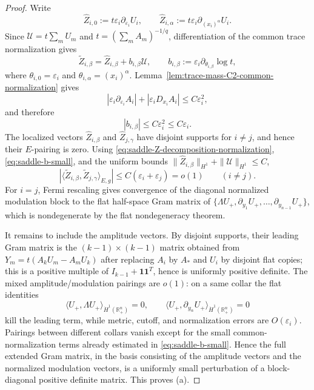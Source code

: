 \documentclass[11pt,reqno,a4paper]{amsart}
\numberwithin{equation}{section}
\theoremstyle{plain}
\theoremstyle{remark}
\theoremstyle{plain}
\begin{document}
\begin{proof}
Write
\[
\widehat Z_{i,0}:=t\varepsilon_i\partial_{\varepsilon_i}U_i,
\qquad
\widehat Z_{i,\alpha}:=t\varepsilon_i\partial_{(x_i)^\alpha}U_i.
\]
Since $\mathcal U=t\sum_mU_m$ and $t=(\sum_mA_m)^{-1/q}$, differentiation of the common trace
normalization gives
\begin{equation}\label{eq:saddle-Z-decomposition-normalization}
\widetilde Z_{i,\beta}
=\widehat Z_{i,\beta}+b_{i,\beta}\mathcal U,
\qquad
b_{i,\beta}:=\varepsilon_i\partial_{\theta_{i,\beta}}\log t,
\end{equation}
where $\theta_{i,0}=\varepsilon_i$ and $\theta_{i,\alpha}=(x_i)^\alpha$.
Lemma~\ref{lem:trace-mass-C2-common-normalization} gives
\[
|\varepsilon_i\partial_{\varepsilon_i}A_i|+|\varepsilon_iD_{x_i}A_i|
\le C\varepsilon_i^2,
\]
and therefore
\begin{equation}\label{eq:saddle-b-small}
|b_{i,\beta}|\le C\varepsilon_i^2\le C\varepsilon_i.
\end{equation}
The localized vectors $\widehat Z_{i,\beta}$ and $\widehat Z_{j,\gamma}$ have disjoint supports for
$i\ne j$, and hence their $E$-pairing is zero.  Using \eqref{eq:saddle-Z-decomposition-normalization},
\eqref{eq:saddle-b-small}, and the uniform bounds
$\|\widehat Z_{i,\beta}\|_{H^1}+\|\mathcal U\|_{H^1}\le C$,
\begin{equation}\label{eq:saddle-modulation-cross}
|\langle \widetilde Z_{i,\beta},\widetilde Z_{j,\gamma}\rangle_{E,g}|
\le C(\varepsilon_i+\varepsilon_j)
=o(1)
\qquad(i\ne j).
\end{equation}
For $i=j$, Fermi rescaling gives convergence of the diagonal normalized modulation block to the flat
half-space Gram matrix of
$\{\Lambda U_+,\partial_{y_1}U_+,\dots,\partial_{y_{n-1}}U_+\}$, which is nondegenerate by the
flat nondegeneracy theorem.

It remains to include the amplitude vectors.  By disjoint supports, their leading Gram matrix is the
$(k-1)\times(k-1)$ matrix obtained from
$Y_m=t(A_kU_m-A_mU_k)$ after replacing $A_i$ by $A_\ast$ and $U_i$ by disjoint flat copies; this is a
positive multiple of $I_{k-1}+\mathbf 1\mathbf 1^T$, hence is uniformly positive definite.  The mixed
amplitude/modulation pairings are $o(1)$: on a same collar the flat identities
\[
\langle U_+,\Lambda U_+\rangle_{\dot H^1(\mathbb R^n_+)}=0,
\qquad
\langle U_+,\partial_{y_\alpha}U_+\rangle_{\dot H^1(\mathbb R^n_+)}=0
\]
kill the leading term, while metric, cutoff, and normalization errors are
$O(\varepsilon_i)$.  Pairings between different collars vanish except for the small common-normalization
terms already estimated in \eqref{eq:saddle-b-small}.  Hence the full extended Gram matrix, in the
basis consisting of the amplitude vectors and the normalized modulation vectors, is a uniformly small
perturbation of a block-diagonal positive definite matrix.  This proves \textup{(a)}.


\end{proof}
\end{document}
